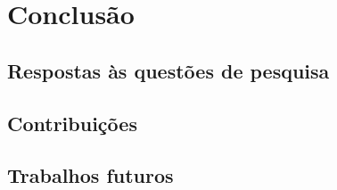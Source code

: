 \chapter{Conclusão}
\label{chap:conclusao}


\section{Respostas às questões de pesquisa}
\label{sec:conclusao-respostas-as-questoes-de-pesquisa}

\section{Contribuições}
\label{sec:conclusao-contribuicoes}

\section{Trabalhos futuros}
\label{sec:conclusao-trabalhos-futuros}
